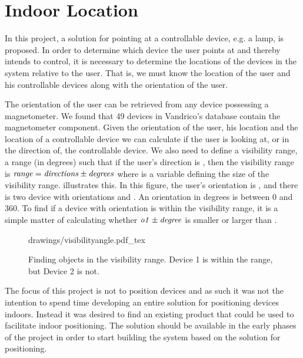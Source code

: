 \section{Indoor Location}\label{sec:designindoorlocation}

In this project, a solution for pointing at a controllable device, e.g. a lamp, is proposed. In order to determine which device the user points at and thereby intends to control, it is necessary to determine the locations of the devices in the system relative to the user. That is, we must know the location of the user and his controllable devices along with the orientation of the user.

The orientation of the user can be retrieved from any device possessing a magnetometer. We found that 49 devices in Vandrico's database contain the magnetometer component. Given the orientation of the user, his location and the location of a controllable device we can calculate if the user is looking at, or in the direction of, the controllable device. We also need to define a visibility range, \ie a range (in degrees) such that if the user's direction is , then the visibility range  is $\var{range} = \var{directions} \pm \var{degrees}$ where  is a variable defining the size of the visibility range. 
 illustrates this. In this figure, the user's orientation is , and there is two device with orientations  and . An orientation in degrees is between \num{0} and \num{360}. To find if a device with orientation  is within the visibility range, it is a simple matter of calculating whether $\var{o1} \pm \var{degree}$ is smaller or larger than .

\begin{figure}[!htb]
    \centering
    \def\svgwidth{0.6\textwidth}
    {drawings/visibilityangle.pdf_tex}
    \caption{Finding objects in the visibility range. Device 1 is within the range, but Device 2 is not.}
    \label{fig:visibilityangle}
\end{figure}

The focus of this project is not to position devices and as such it was not the intention to spend time developing an entire solution for positioning devices indoors. 
Instead it was desired to find an existing product that could be used to facilitate indoor positioning.
The solution should be available in the early phases of the project in order to start building the system based on the solution for positioning.


